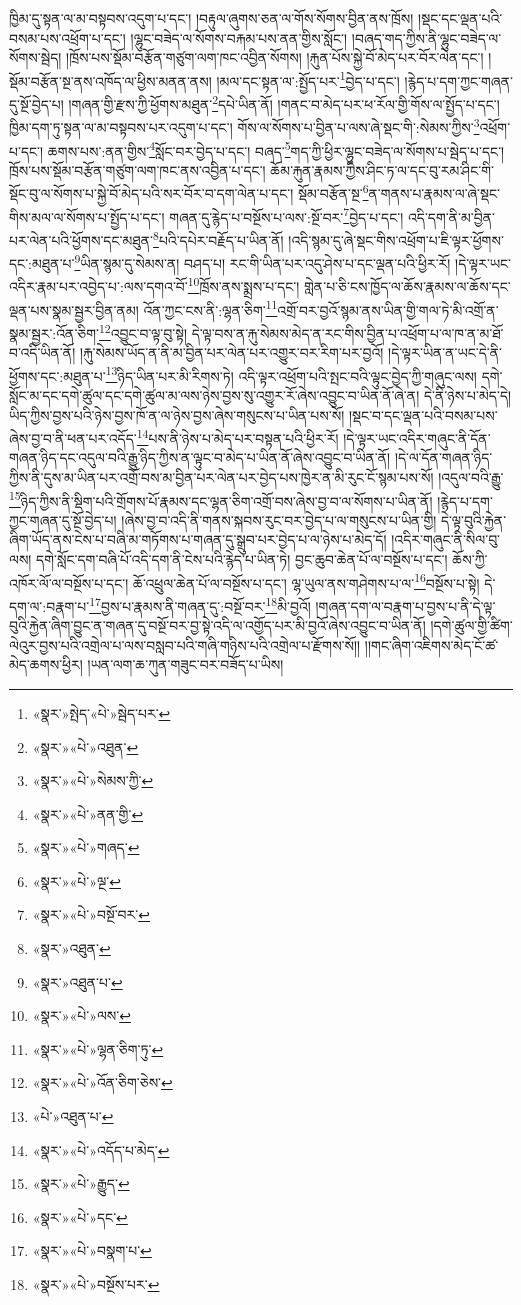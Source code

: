 ཁྱིམ་དུ་སྟན་ལ་མ་བསྟབས་འདུག་པ་དང་། །བརྟུལ་ཞུགས་ཅན་ལ་གོས་སོགས་བྱིན་ནས་ཁྲོས། །སྡང་དང་ལྡན་པའི་བསམ་པས་འཕྲོག་པ་དང་། །ལྷུང་བཟེད་ལ་སོགས་བརྐམ་པས་ནན་གྱིས་སློང་། །བཞད་གད་ཀྱིས་ནི་ལྷུང་བཟེད་ལ་སོགས་སྦེད། །ཁྲོས་པས་སྡོམ་བརྩོན་གཙུག་ལག་ཁང་འབྱིན་སོགས། །རྐུན་པོས་སྐྱེ་བོ་མེད་པར་བོར་ལེན་དང་། །སྡོམ་བརྩོན་སྔ་ནས་འཁོད་ལ་ཕྱིས་མནན་ནས། །མལ་དང་སྟན་ལ་:སྤྱོད་པར་\footnote{«སྣར་»སྤེད་«པེ་»སྦེད་པར་}བྱེད་པ་དང་། །རྙེད་པ་དག་ཀྱང་གཞན་དུ་སྔོ་བྱེད་པ། །གཞན་གྱི་རྫས་ཀྱི་ཕྱོགས་མཐུན་\footnote{«སྣར་»«པེ་»འཐུན་}དཔེ་ཡིན་ནོ། །གནང་བ་མེད་པར་ཕ་རོལ་གྱི་གོས་ལ་སྤྱོད་པ་དང་། ཁྱིམ་དག་ཏུ་སྟན་ལ་མ་བསྟབས་པར་འདུག་པ་དང་། གོས་ལ་སོགས་པ་བྱིན་པ་ལས་ཞེ་སྡང་གི་:སེམས་ཀྱིས་\footnote{«སྣར་»«པེ་»སེམས་ཀྱི་}འཕྲོག་པ་དང་། ཆགས་པས་:ནན་གྱིས་\footnote{«སྣར་»«པེ་»ནན་གྱི་}སློང་བར་བྱེད་པ་དང་། བཞད་\footnote{«སྣར་»«པེ་»གཞད་}གད་ཀྱི་ཕྱིར་ལྷུང་བཟེད་ལ་སོགས་པ་སྦེད་པ་དང་། ཁྲོས་པས་སྡོམ་བརྩོན་གཙུག་ལག་ཁང་ནས་འབྱིན་པ་དང་། ཆོམ་རྐུན་རྣམས་ཀྱིས་ཤིང་ཏ་ལ་དང་བུ་རམ་ཤིང་གི་སྡོང་བུ་ལ་སོགས་པ་སྐྱེ་བོ་མེད་པའི་སར་བོར་བ་དག་ལེན་པ་དང་། སྡོམ་བརྩོན་སྔ་\footnote{«སྣར་»«པེ་»ལྔ་}ན་གནས་པ་རྣམས་ལ་ཞེ་སྡང་གིས་མལ་ལ་སོགས་པ་སྤྱོད་པ་དང་། གཞན་དུ་རྙེད་པ་བསྔོས་པ་ལས་:སྔོ་བར་\footnote{«སྣར་»«པེ་»བསྔོ་བར་}བྱེད་པ་དང་། འདི་དག་ནི་མ་བྱིན་པར་ལེན་པའི་ཕྱོགས་དང་མཐུན་\footnote{«སྣར་»འཐུན་}པའི་དཔེར་བརྗོད་པ་ཡིན་ནོ། །འདི་སྙམ་དུ་ཞེ་སྡང་གིས་འཕྲོག་པ་ཇི་ལྟར་ཕྱོགས་དང་:མཐུན་པ་\footnote{«སྣར་»འཐུན་པ་}ཡིན་སྙམ་དུ་སེམས་ན། བཤད་པ། རང་གི་ཡིན་པར་འདུ་ཤེས་པ་དང་ལྡན་པའི་ཕྱིར་རོ། །དེ་ལྟར་ཡང་འདིར་རྣམ་པར་འབྱེད་པ་:ལས་དགའ་བོ་\footnote{«སྣར་»«པེ་»ལས་}ཁྲོས་ནས་སྨྲས་པ་དང་། གླེན་པ་ཅི་ངས་ཁྱོད་ལ་ཆོས་རྣམས་ལ་ཆོས་དང་ལྡན་པས་སྣམ་སྦྱར་བྱིན་ནམ། འོན་ཀྱང་ངས་ནི་:ལྷན་ཅིག་\footnote{«སྣར་»«པེ་»ལྷན་ཅིག་ཏུ་}འགྲོ་བར་བྱའོ་སྙམ་ནས་ཡིན་གྱི་གལ་ཏེ་མི་འགྲོ་ན་སྣམ་སྦྱར་:འོན་ཅིག་\footnote{«སྣར་»«པེ་»འོན་ཅིག་ཅེས་}འབྱུང་བ་ལྟ་བུ་སྟེ། དེ་ལྟ་བས་ན་རྐུ་སེམས་མེད་ན་རང་གིས་བྱིན་པ་འཕྲོག་པ་ལ་ཁ་ན་མ་ཐོ་བ་འདི་ཡིན་ནོ། །རྐུ་སེམས་ཡོད་ན་ནི་མ་བྱིན་པར་ལེན་པར་འགྱུར་བར་རིག་པར་བྱའོ། །དེ་ལྟར་ཡིན་ན་ཡང་དེ་ནི་ཕྱོགས་དང་:མཐུན་པ་\footnote{«པེ་»འཐུན་པ་}ཉིད་ཡིན་པར་མི་རིགས་ཏེ། འདི་ལྟར་འཕྲོག་པའི་སྤང་བའི་ལྟུང་བྱེད་ཀྱི་གཞུང་ལས། དགེ་སློང་མ་དང་དགེ་ཚུལ་དང་དགེ་ཚུལ་མ་ལས་ཉེས་བྱས་སུ་འགྱུར་རོ་ཞེས་འབྱུང་བ་ཡིན་ནོ་ཞེ་ན། དེ་ནི་ཉེས་པ་མེད་དེ། ཡིད་ཀྱིས་བྱས་པའི་ཉེས་བྱས་ཁོ་ན་ལ་ཉེས་བྱས་ཞེས་གསུངས་པ་ཡིན་པས་སོ། །སྡང་བ་དང་ལྡན་པའི་བསམ་པས་ཞེས་བྱ་བ་ནི་ཕན་པར་འདོད་\footnote{«སྣར་»«པེ་»འདོད་པ་མེད་}པས་ནི་ཉེས་པ་མེད་པར་བསྟན་པའི་ཕྱིར་རོ། །དེ་ལྟར་ཡང་འདིར་གཞུང་ནི་དོན་གཞན་ཉིད་དང་འདུལ་བའི་རྒྱུ་ཉིད་ཀྱིས་ན་ལྟུང་བ་མེད་པ་ཡིན་ནོ་ཞེས་འབྱུང་བ་ཡིན་ནོ། །དེ་ལ་དོན་གཞན་ཉིད་ཀྱིས་ནི་དུས་མ་ཡིན་པར་འགྲོ་བས་མ་བྱིན་པར་ལེན་པར་བྱེད་པས་ཁྱེར་ན་མི་རུང་ངོ་སྙམ་པས་སོ། །འདུལ་བའི་རྒྱུ་\footnote{«སྣར་»«པེ་»རྒྱུད་}ཉིད་ཀྱིས་ནི་སྡིག་པའི་གྲོགས་པོ་རྣམས་དང་ལྷན་ཅིག་འགྲོ་བས་ཞེས་བྱ་བ་ལ་སོགས་པ་ཡིན་ནོ། །རྙེད་པ་དག་ཀྱང་གཞན་དུ་སྔོ་བྱེད་པ། །ཞེས་བྱ་བ་འདི་ནི་གནས་སྐབས་རུང་བར་བྱེད་པ་ལ་གསུངས་པ་ཡིན་གྱི། དེ་ལྟ་བུའི་རྐྱེན་ཞིག་ཡོད་ནས་ངེས་པ་བཞི་མ་གཏོགས་པ་གཞན་དུ་སྒྲུབ་པར་བྱེད་པ་ལ་ཉེས་པ་མེད་དོ། །འདིར་གཞུང་ནི་སིལ་བུ་ལས། དགེ་སློང་དག་བཞི་པོ་འདི་དག་ནི་ངེས་པའི་རྙེད་པ་ཡིན་ཏེ། བྱང་ཆུབ་ཆེན་པོ་ལ་བསྔོས་པ་དང་། ཆོས་ཀྱི་འཁོར་ལོ་ལ་བསྔོས་པ་དང་། ཆོ་འཕྲུལ་ཆེན་པོ་ལ་བསྔོས་པ་དང་། ལྷ་ཡུལ་ནས་གཤེགས་པ་ལ་\footnote{«སྣར་»«པེ་»དང་}བསྔོས་པ་སྟེ། དེ་དག་ལ་:བརྣག་པ་\footnote{«སྣར་»«པེ་»བསྣག་པ་}བྱས་པ་རྣམས་ནི་གཞན་དུ་:བསྔོ་བར་\footnote{«སྣར་»«པེ་»བསྔོས་པར་}མི་བྱའོ། །གཞན་དག་ལ་བརྣག་པ་བྱས་པ་ནི་དེ་ལྟ་བུའི་རྐྱེན་ཞིག་བྱུང་ན་གཞན་དུ་བསྔོ་བར་བྱ་སྟེ་འདི་ལ་འགྱོད་པར་མི་བྱའོ་ཞེས་འབྱུང་བ་ཡིན་ནོ། །དགེ་ཚུལ་གྱི་ཚིག་ལེའུར་བྱས་པའི་འགྲེལ་པ་ལས་བསླབ་པའི་གཞི་གཉིས་པའི་འགྲེལ་པ་རྫོགས་སོ།། །།གང་ཞིག་འཇིགས་མེད་ངོ་ཚ་མེད་ཆགས་ཕྱིར། །ཡན་ལག་ཆ་ཀུན་གཟུང་བར་བཟོད་པ་ཡིས། 